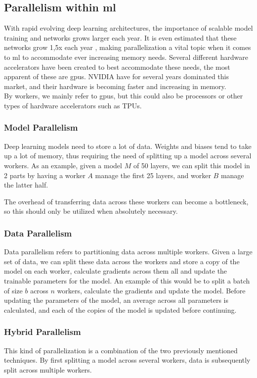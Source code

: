 \subsection{Parallelism within \acrlong{ml}}

With rapid evolving deep learning architectures, the importance of scalable model training and networks grows larger each year. It is even estimated that these networks grow 1,5x each year \cite{9499913}, making parallelization a vital topic when it comes to \acrlong{ml} to accommodate ever increasing memory needs. Several different hardware accelerators have been created to best accommodate these needs, the most apparent of these are \acrshort{gpu}s. NVIDIA have for several years dominated this market, and their hardware is becoming faster and increasing in memory. \\

By workers, we mainly refer to \acrshort{gpu}s, but this could also be processors or other types of hardware accelerators such as TPUs.


\subsubsection{Model Parallelism}

Deep learning models need to store a lot of data. Weights and biases tend to take up a lot of memory, thus requiring the need of splitting up a model across several workers. As an example, given a model $M$ of 50 layers, we can split this model in 2 parts by having a worker $A$ manage the first 25 layers, and worker $B$ manage the latter half.

The overhead of transferring data across these workers can become a bottleneck, so this should only be utilized when absolutely necessary.

\subsubsection{Data Parallelism}

Data parallelism refers to partitioning data across multiple workers.  Given a large set of data, we can split these data across the workers and store a copy of the model on each worker, calculate gradients across them all and update the trainable parameters for the model. An example of this would be to split a batch of size $b$ across $n$ workers, calculate the gradients and update the model. Before updating the parameters of the model, an average across all parameters is calculated, and each of the copies of the model is updated before continuing.

\subsubsection{Hybrid Parallelism}

This kind of parallelization is a combination of the two previously mentioned techniques. By first splitting a model across several workers, data is subsequently split across multiple workers. 

